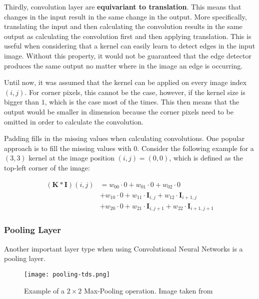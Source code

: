 Thirdly, convolution layer are \textbf{equivariant to translation}.
This means that changes in the input result in the same change in the output.
More specifically, translating the input and then calculating the convolution results in the same output as calculating the convolution first and then applying translation.
This is useful when considering that a kernel can easily learn to detect edges in the input image.
Without this property, it would not be guaranteed that the edge detector produces the same output no matter where in the image an edge is occurring.

Until now, it was assumed that the kernel can be applied on every image index $(i,j)$.
For corner pixels, this cannot be the case, however, if the kernel size is bigger than $1$, which is the case most of the times.
This then means that the output would be smaller in dimension because the corner pixels need to be omitted in order to calculate the convolution.

Padding fills in the missing values when calculating convolutions.
One popular approach is to fill the missing values with $0$. Consider the following example for a $(3,3)$ kernel at the image position $(i,j) = (0,0)$, which is defined as the top-left corner of the image:

\begin{equation}
    \begin{split}
        (\bm{K} * \bm{I})(i,j)
        &= w_{00} \cdot 0 + w_{01} \cdot 0 + w_{02} \cdot 0 \\
        &+ w_{10} \cdot 0 + w_{11} \cdot \bm{I}_{i,j} + w_{12} \cdot \bm{I}_{i+1,j} \\
        &+ w_{20} \cdot 0 + w_{21} \cdot \bm{I}_{i,j+1} + w_{22} \cdot \bm{I}_{i+1,j+1}
    \end{split}
\end{equation}






\subsubsection{Pooling Layer}
Another important layer type when using Convolutional Neural Networks is a pooling layer.

\begin{figure}[htb!]
    \centering
    \texttt{[image: pooling-tds.png]}
    \caption{Example of a $2 \times 2$ Max-Pooling operation. Image taken from \cite{cornelisse_intuitive_2018}}
    \label{fig:pooling-tds}
\end{figure}

